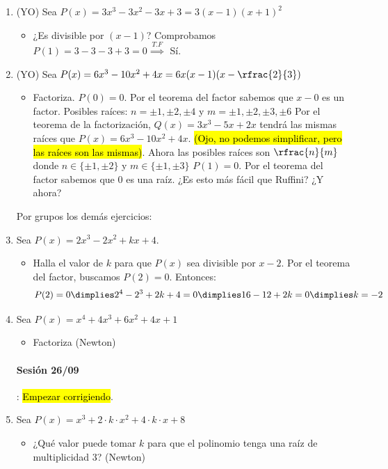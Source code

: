 \begin{enumerate}
\item (YO) Sea $P(x) = 3x^3-3x^2-3x+3 = 3(x-1)(x+1)^2$
\begin{itemize}
	\item ¿Es divisible por $(x-1)$? Comprobamos $P(1) = 3-3-3+3 = 0 \overset{T.F}{\implies}$ Sí.
\end{itemize}

\item (YO) Sea $P(x) = 6x^3-10x^2+4x = 6x(x-1)(x-\rfrac{2}{3})$ 
\begin{itemize}
	\item Factoriza.
	\subitem $P(0) = 0$. Por el teorema del factor sabemos que $x-0$ es un factor.
	\subitem Posibles raíces: $n=\pm1,\pm2,\pm4$ y $m=\pm1,\pm2,\pm3,\pm6$	
	\subitem Por el teorema de la factorización, $Q(x) = 3x^3-5x+2x$ tendrá las mismas raíces que $P(x) = 6x^3-10x^2+4x$. \hl{(Ojo, no podemos simplificar, pero las raíces son las mismas)}. Ahora las posibles raíces son $\rfrac{n}{m}$ donde $n\in\{\pm1,\pm2\}$ y $m\in\{\pm1,\pm3\}$
	\subitem $P(1) = 0$. Por el teorema del factor sabemos que $0$ es una raíz. ¿Es esto más fácil que Ruffini? ¿Y ahora?
\end{itemize}

Por grupos los demás ejercicios:
\item Sea $P(x) = 2x^3-2x^2+kx+4$.
\begin{itemize}
	\item Halla el valor de $k$ para que $P(x)$ sea divisible por $x-2$.
	\subitem Por el teorema del factor, buscamos $P(2) = 0$. Entonces:
	\[
		P(2) = 0 \dimplies 2^4-2^3+2k+4 = 0 \dimplies 16-12+2k = 0 \dimplies k = -2
	\]
\end{itemize}


\item Sea $P(x) = x^4+4x^3+6x^2+4x+1$
\begin{itemize}
	\item Factoriza (Newton)
\end{itemize}

\paragraph{Sesión 26/09}: \hl{Empezar corrigiendo}.

\item Sea $P(x) = x^3+2·k·x^2+4·k·x+8$
\begin{itemize}
	\item ¿Qué valor puede tomar $k$ para que el polinomio tenga una raíz de multiplicidad 3? (Newton)
\end{itemize}



\end{enumerate}
